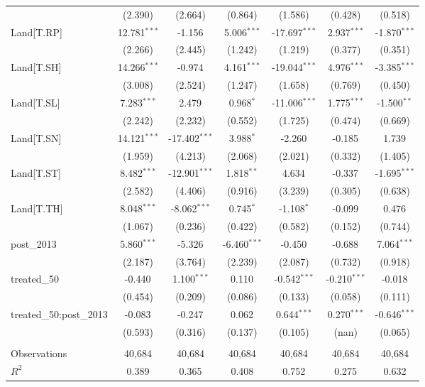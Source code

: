 \begin{table}[!htbp]
\begin{tabular}{@{\extracolsep{5pt}}lcccccc}
  & (2.390) & (2.664) & (0.864) & (1.586) & (0.428) & (0.518) \\
 Land[T.RP] & 12.781$^{***}$ & -1.156$^{}$ & 5.006$^{***}$ & -17.697$^{***}$ & 2.937$^{***}$ & -1.870$^{***}$ \\
  & (2.266) & (2.445) & (1.242) & (1.219) & (0.377) & (0.351) \\
 Land[T.SH] & 14.266$^{***}$ & -0.974$^{}$ & 4.161$^{***}$ & -19.044$^{***}$ & 4.976$^{***}$ & -3.385$^{***}$ \\
  & (3.008) & (2.524) & (1.247) & (1.658) & (0.769) & (0.450) \\
 Land[T.SL] & 7.283$^{***}$ & 2.479$^{}$ & 0.968$^{*}$ & -11.006$^{***}$ & 1.775$^{***}$ & -1.500$^{**}$ \\
  & (2.242) & (2.232) & (0.552) & (1.725) & (0.474) & (0.669) \\
 Land[T.SN] & 14.121$^{***}$ & -17.402$^{***}$ & 3.988$^{*}$ & -2.260$^{}$ & -0.185$^{}$ & 1.739$^{}$ \\
  & (1.959) & (4.213) & (2.068) & (2.021) & (0.332) & (1.405) \\
 Land[T.ST] & 8.482$^{***}$ & -12.901$^{***}$ & 1.818$^{**}$ & 4.634$^{}$ & -0.337$^{}$ & -1.695$^{***}$ \\
  & (2.582) & (4.406) & (0.916) & (3.239) & (0.305) & (0.638) \\
 Land[T.TH] & 8.048$^{***}$ & -8.062$^{***}$ & 0.745$^{*}$ & -1.108$^{*}$ & -0.099$^{}$ & 0.476$^{}$ \\
  & (1.067) & (0.236) & (0.422) & (0.582) & (0.152) & (0.744) \\
 post_2013 & 5.860$^{***}$ & -5.326$^{}$ & -6.460$^{***}$ & -0.450$^{}$ & -0.688$^{}$ & 7.064$^{***}$ \\
  & (2.187) & (3.764) & (2.239) & (2.087) & (0.732) & (0.918) \\
 treated_50 & -0.440$^{}$ & 1.100$^{***}$ & 0.110$^{}$ & -0.542$^{***}$ & -0.210$^{***}$ & -0.018$^{}$ \\
  & (0.454) & (0.209) & (0.086) & (0.133) & (0.058) & (0.111) \\
 treated_50:post_2013 & -0.083$^{}$ & -0.247$^{}$ & 0.062$^{}$ & 0.644$^{***}$ & 0.270$^{***}$ & -0.646$^{***}$ \\
  & (0.593) & (0.316) & (0.137) & (0.105) & (nan) & (0.065) \\
\hline \\[-1.8ex]
 Observations & 40,684 & 40,684 & 40,684 & 40,684 & 40,684 & 40,684 \\
 $R^2$ & 0.389 & 0.365 & 0.408 & 0.752 & 0.275 & 0.632 \\

\end{tabular}
\end{table}
